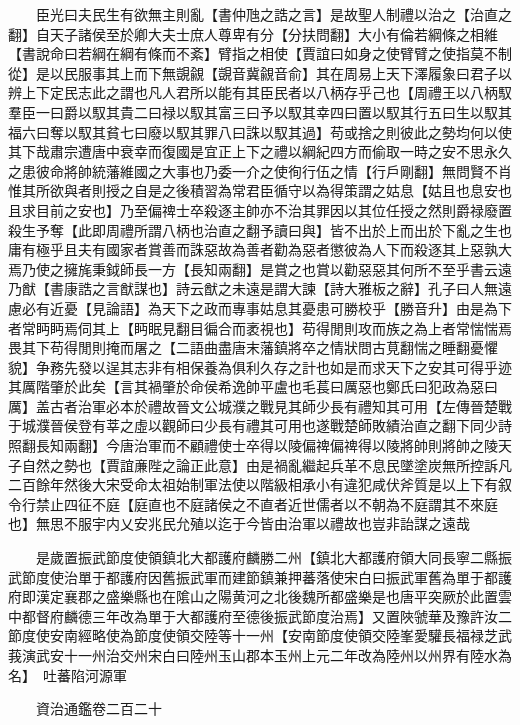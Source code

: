 　　臣光曰夫民生有欲無主則亂【書仲虺之誥之言】是故聖人制禮以治之【治直之翻】自天子諸侯至於卿大夫士庶人尊卑有分【分扶問翻】大小有倫若綱條之相維【書說命曰若綱在綱有條而不紊】臂指之相使【賈誼曰如身之使臂臂之使指莫不制從】是以民服事其上而下無覬覦【覬音冀覦音俞】其在周易上天下澤履象曰君子以辨上下定民志此之謂也凡人君所以能有其臣民者以八柄存乎己也【周禮王以八柄馭羣臣一曰爵以馭其貴二曰禄以馭其富三曰予以馭其幸四曰置以馭其行五曰生以馭其福六曰奪以馭其貧七曰廢以馭其罪八曰誅以馭其過】苟或捨之則彼此之勢均何以使其下哉肅宗遭唐中衰幸而復國是宜正上下之禮以綱紀四方而偷取一時之安不思永久之患彼命將帥統藩維國之大事也乃委一介之使徇行伍之情【行戶剛翻】無問賢不肖惟其所欲與者則授之自是之後積習為常君臣循守以為得策謂之姑息【姑且也息安也且求目前之安也】乃至偏禆士卒殺逐主帥亦不治其罪因以其位任授之然則爵禄廢置殺生予奪【此即周禮所謂八柄也治直之翻予讀曰與】皆不出於上而出於下亂之生也庸有極乎且夫有國家者賞善而誅惡故為善者勸為惡者懲彼為人下而殺逐其上惡孰大焉乃使之擁旄秉鉞師長一方【長知兩翻】是賞之也賞以勸惡惡其何所不至乎書云遠乃猷【書康誥之言猷謀也】詩云猷之未遠是謂大諫【詩大雅板之辭】孔子曰人無遠慮必有近憂【見論語】為天下之政而專事姑息其憂患可勝校乎【勝音升】由是為下者常眄眄焉伺其上【眄眠見翻目徧合而袤視也】苟得閒則攻而族之為上者常惴惴焉畏其下苟得閒則掩而屠之【二語曲盡唐末藩鎮將卒之情狀問古莧翻惴之睡翻憂懼貌】争務先發以逞其志非有相保養為俱利久存之計也如是而求天下之安其可得乎迹其厲階肇於此矣【言其禍肇於命侯希逸帥平盧也毛萇曰厲惡也鄭氏曰犯政為惡曰厲】盖古者治軍必本於禮故晉文公城濮之戰見其師少長有禮知其可用【左傳晉楚戰于城濮晉侯登有莘之虛以觀師曰少長有禮其可用也遂戰楚師敗績治直之翻下同少詩照翻長知兩翻】今唐治軍而不顧禮使士卒得以陵偏禆偏禆得以陵將帥則將帥之陵天子自然之勢也【賈誼亷陛之論正此意】由是禍亂繼起兵革不息民墜塗炭無所控訴凡二百餘年然後大宋受命太祖始制軍法使以階級相承小有違犯咸伏斧質是以上下有叙令行禁止四征不庭【庭直也不庭諸侯之不直者近世儒者以不朝為不庭謂其不來庭也】無思不服宇内乂安兆民允殖以迄于今皆由治軍以禮故也豈非詒謀之遠哉

　　是歲置振武節度使領鎮北大都護府麟勝二州【鎮北大都護府領大同長寧二縣振武節度使治單于都護府因舊振武軍而建節鎮兼押蕃落使宋白曰振武軍舊為單于都護府即漢定襄郡之盛樂縣也在隂山之陽黄河之北後魏所都盛樂是也唐平突厥於此置雲中都督府麟德三年改為單于大都護府至德後振武節度治焉】又置陜虢華及豫許汝二節度使安南經略使為節度使領交陸等十一州【安南節度使領交陸峯愛驩長福禄芝武莪演武安十一州治交州宋白曰陸州玉山郡本玉州上元二年改為陸州以州界有陸水為名】　吐蕃陷河源軍

　　資治通鑑卷二百二十  
    


 


